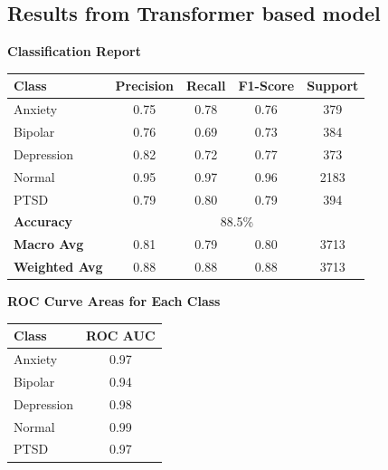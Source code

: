 \pagebreak

\subsection{Results from Transformer based model}
\begin{center}
    \textbf{Classification Report} \\[0.5em]
    \begin{tabular}{|l|c|c|c|c|}
        \hline
        \textbf{Class} & \textbf{Precision} & \textbf{Recall} & \textbf{F1-Score} & \textbf{Support} \\ \hline
        Anxiety        & 0.75               & 0.78            & 0.76              & 379             \\ \hline
        Bipolar        & 0.76               & 0.69            & 0.73              & 384             \\ \hline
        Depression     & 0.82               & 0.72            & 0.77              & 373             \\ \hline
        Normal         & 0.95               & 0.97            & 0.96              & 2183            \\ \hline
        PTSD           & 0.79               & 0.80            & 0.79              & 394             \\ \hline
        \textbf{Accuracy} & \multicolumn{4}{|c|}{88.5\%} \\ \hline
        \textbf{Macro Avg} & 0.81            & 0.79            & 0.80              & 3713            \\ \hline
        \textbf{Weighted Avg} & 0.88         & 0.88            & 0.88              & 3713            \\ \hline
    \end{tabular}
\end{center}

\begin{center}
    \textbf{ROC Curve Areas for Each Class} \\[0.5em]
    \begin{tabular}{|l|c|}
        \hline
        \textbf{Class}  & \textbf{ROC AUC} \\ \hline
        Anxiety         & 0.97            \\ \hline
        Bipolar         & 0.94            \\ \hline
        Depression      & 0.98            \\ \hline
        Normal          & 0.99            \\ \hline
        PTSD            & 0.97            \\ \hline
    \end{tabular}
\end{center}

